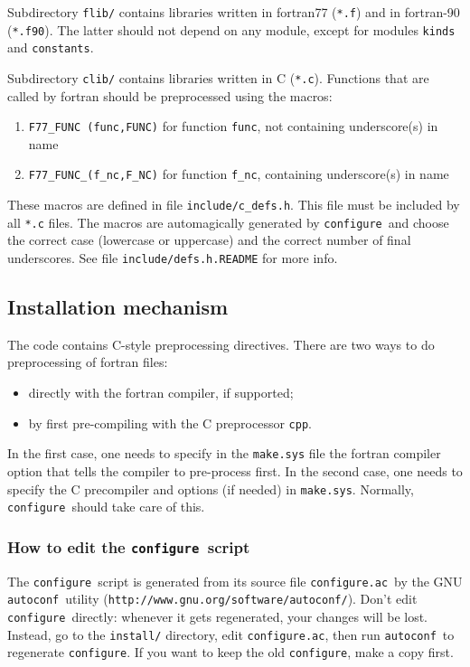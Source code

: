 \documentclass[12pt,a4paper]{article}
\def\configure{\texttt{configure}}
\def\configurac{\texttt{configure.ac}}
\def\autoconf{\texttt{autoconf}}
\begin{document}
Subdirectory \texttt{flib/} contains libraries written in fortran77 
(\texttt{*.f}) and in fortran-90 (\texttt{*.f90}).
The latter should not depend on any module, except for modules
\texttt{kinds} and \texttt{constants}.

Subdirectory \texttt{clib/} contains libraries written in C 
(\texttt{*.c}). Functions that are called by fortran
should be preprocessed using the macros:
\begin{enumerate}
\item \texttt{F77\_FUNC (func,FUNC)} for function \texttt{func}, not
  containing underscore(s) in name  
\item \texttt{F77\_FUNC\_(f\_nc,F\_NC)} for function \texttt{f\_nc},
  containing underscore(s) in name 
\end{enumerate}
These macros are defined in file \texttt{include/c\_defs.h}. This file must be included
by all \texttt{*.c} files. The macros are automagically generated by 
\configure\ and 
choose the correct case 
(lowercase or uppercase) and the correct number of final underscores. 
See file \texttt{include/defs.h.README} for more info.

\subsection{Installation mechanism}

\label{SubSec:Inst}
The code contains C-style preprocessing directives. There are two ways
to do preprocessing of fortran files: 
\begin{itemize}
\item directly with the fortran compiler, if supported;
\item by first pre-compiling with the C preprocessor \texttt{cpp}.
\end{itemize}

In the first case, one needs to specify in the \texttt{make.sys} file
the fortran compiler option that tells the compiler to pre-process
first. In the second case, one needs to specify the C precompiler and
options (if needed) in \texttt{make.sys}. 
Normally, \configure\ should take care of this.

\subsubsection{ How to edit the \configure\ script}

The \configure\ script is generated from its source file
\configurac\ by the GNU \autoconf\ utility
(\texttt{http://www.gnu.org/software/autoconf/}).  Don't edit \configure\
directly: whenever it gets regenerated, your changes will be lost.
Instead, go to the \texttt{install/} directory, edit \configurac, 
then run \autoconf\ to regenerate \configure. If you want 
to keep the old \configure, make a copy
first.
\end{document}
